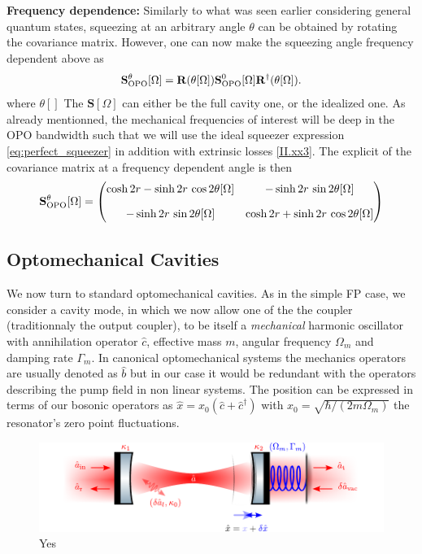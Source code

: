 \noindent\textbf{Frequency dependence: } Similarly to what was seen earlier considering general quantum states, squeezing at an arbitrary angle $\theta$ can be obtained by rotating the covariance matrix. However, one can now make the squeezing angle frequency dependent
above as
\begin{equation}
\mathbf{S}^{\theta}_{\rm OPO}[\Omega] = \mathbf R(\theta[\Omega])
\mathbf{S}^0_{\rm OPO}[\Omega] 
\mathbf R^{\dagger}(\theta[\Omega]).
\label{II.xx4}
\end{equation}
where $\theta[]$
The $\mathbf{S}[\Omega]$ can either be the full cavity one, or the idealized one. As already mentionned, the mechanical frequencies of interest will be deep in the OPO bandwidth such that we will use the ideal squeezer expression \eqref{eq:perfect_squeezer} in addition with extrinsic losses \eqref{II.xx3}. The explicit of the covariance matrix at a frequency dependent angle is then
\begin{equation}
      \mathbf{S}^{\theta}_{\rm OPO}[\Omega] =\begin{pmatrix}
         \cosh 2r  - \sinh 2r \, \cos 2\theta[\Omega]  & -\sinh 2r \, \sin 2\theta[\Omega]  \\[10pt]
        -\sinh 2r \, \sin 2\theta[\Omega]  & \cosh 2r  + \sinh 2r \, \cos 2\theta[\Omega] 
      \end{pmatrix}
\end{equation}


\subsection{Optomechanical Cavities}
We now turn to standard optomechanical cavities. As in the simple FP case, we consider a cavity mode, in which we now allow one of the the coupler (traditionnaly the output coupler), to be itself a \textit{mechanical} harmonic oscillator with annihilation operator $\hat{c}$, effective mass $m$, angular frequency $\Omega_m$ and damping rate $\Gamma_m$. In canonical optomechanical systems the mechanics operators are usually denoted as $\hat b$ but in our case it would be redundant with the operators describing the pump field in non linear systems. The position can be expressed in terms of our bosonic operators as  $\hat{x}=x_0(\hat{c}+\hat{c}^{\dagger})$ with $x_0 = \sqrt{\hbar/(2m\Omega_m)}$ the resonator's zero point fluctuations. 

\begin{figure}[h!]
\centering
\includegraphics[width=\textwidth]{./chap2/fig/CavityOM.pdf}
\caption{Yes} 
\label{fig:cavity_types}
\end{figure}

